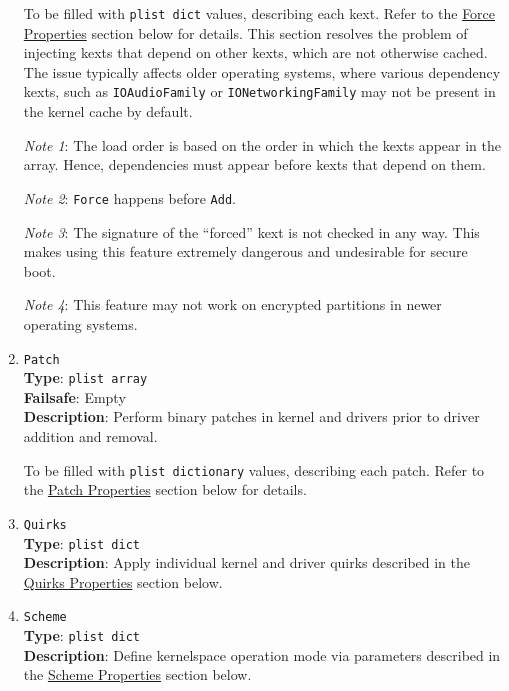 \documentclass[]{article}
\begin{document}
\begin{enumerate}
  To be filled with \texttt{plist\ dict} values, describing each kext.
  Refer to the \hyperref[kernelpropsforce]{Force Properties} section below for details.
  This section resolves the problem of injecting kexts that depend on other
  kexts, which are not otherwise cached. The issue typically affects older
  operating systems, where various dependency kexts, such as \texttt{IOAudioFamily}
  or \texttt{IONetworkingFamily} may not be present in the kernel cache by default.

  \emph{Note 1}: The load order is based on the order in which the kexts appear in
  the array. Hence, dependencies must appear before kexts that depend on them.

  \emph{Note 2}: \texttt{Force} happens before \texttt{Add}.

  \emph{Note 3}: The signature of the ``forced'' kext is not checked in any way.
  This makes using this feature extremely dangerous and undesirable for secure boot.

  \emph{Note 4}: This feature may not work on encrypted partitions in newer operating systems.

\item
  \texttt{Patch}\\
  \textbf{Type}: \texttt{plist\ array}\\
  \textbf{Failsafe}: Empty\\
  \textbf{Description}: Perform binary patches in kernel and drivers prior to
  driver addition and removal.

  To be filled with \texttt{plist\ dictionary} values, describing each patch.
  Refer to the \hyperref[kernelpropspatch]{Patch Properties} section below for details.

\item
  \texttt{Quirks}\\
  \textbf{Type}: \texttt{plist\ dict}\\
  \textbf{Description}: Apply individual kernel and driver quirks described
  in the \hyperref[kernelpropsquirks]{Quirks Properties} section below.

\item
  \texttt{Scheme}\\
  \textbf{Type}: \texttt{plist\ dict}\\
  \textbf{Description}: Define kernelspace operation mode via parameters
  described in the \hyperref[kernelpropsscheme]{Scheme Properties} section below.


\end{enumerate}
\end{document}
